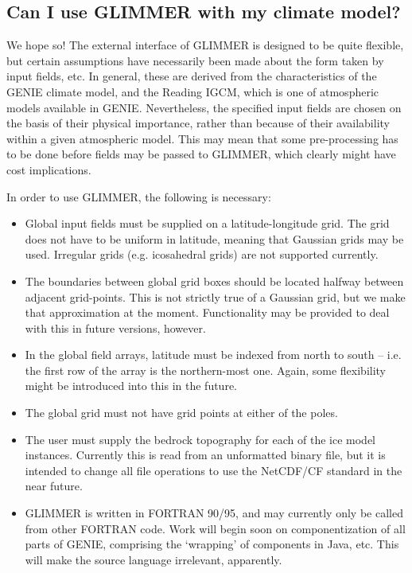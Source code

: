 \documentclass[11pt]{article}
\begin{document}
\subsection{Can I use GLIMMER with my climate model?}

We hope so! The external interface of GLIMMER is designed to be quite
flexible, but certain assumptions have necessarily been made about the form
taken by input fields, etc. In general, these are derived from the
characteristics of the GENIE climate model, and the Reading IGCM, which is one
of atmospheric models available in GENIE. Nevertheless, the specified input
fields are chosen on the basis of their physical importance, rather than
because of their availability within a given atmospheric model. This may mean
that some pre-processing has to be done before fields may be passed to
GLIMMER, which clearly might have cost implications.

In order to use GLIMMER, the following is necessary:

\begin{itemize}
\item Global input fields must be supplied on a latitude-longitude
  grid. The grid does not have to be uniform in latitude, meaning that
  Gaussian grids may be used. Irregular grids (e.g. icosahedral grids) are not
  supported currently. 
\item The boundaries between global grid boxes should be located halfway
  between adjacent grid-points. This is not strictly true of a Gaussian grid,
  but we make that approximation at the moment. Functionality may be provided
  to deal with this in future versions, however.
\item In the global field arrays, latitude must be indexed from north to south
  -- i.e. the first row of the array is the northern-most one. Again, some
  flexibility might be introduced into this in the future.
\item The global grid must not have grid points at either of the poles.
\item The user must supply the bedrock topography for each of the ice model
  instances. Currently this is read from an unformatted binary file, but it is
  intended to change all file operations to use the NetCDF/CF standard in the
  near future.
\item GLIMMER is written in FORTRAN 90/95, and may currently only be called from
  other FORTRAN code. Work will begin soon on componentization of
  all parts of GENIE, comprising the `wrapping' of components in Java,
  etc. This will make the source language irrelevant, apparently.
\end{itemize}
\end{document}
